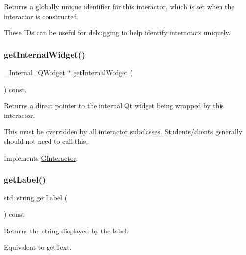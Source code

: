 Returns a globally unique identifier for this interactor, which is set when the interactor is constructed. 

These I\+Ds can be useful for debugging to help identify interactors uniquely. \mbox{\label{classsgl_1_1GLabel_a2f6b36b2517087dc90a366b5ce1f5323}} 
\subsubsection{\texorpdfstring{get\+Internal\+Widget()}{getInternalWidget()}}
{\footnotesize\ttfamily \+\_\+\+Internal\+\_\+\+Q\+Widget $\ast$ get\+Internal\+Widget (\begin{DoxyParamCaption}{ }\end{DoxyParamCaption}) const\hspace{0.3cm}{\ttfamily [override]}, {\ttfamily [virtual]}}



Returns a direct pointer to the internal Qt widget being wrapped by this interactor. 

This must be overridden by all interactor subclasses. Students/clients generally should not need to call this. 

Implements \mbox{\hyperlink{classsgl_1_1GInteractor}{G\+Interactor}}.

\mbox{\label{classsgl_1_1GLabel_aa73aa351564b091c0658f2368c6d5c5f}} 
\subsubsection{\texorpdfstring{get\+Label()}{getLabel()}}
{\footnotesize\ttfamily std\+::string get\+Label (\begin{DoxyParamCaption}{ }\end{DoxyParamCaption}) const\hspace{0.3cm}{\ttfamily [virtual]}}



Returns the string displayed by the label. 

Equivalent to get\+Text. \mbox{\label{classsgl_1_1GInteractor_a4f83802015511edeb63b892830812c11}} 
